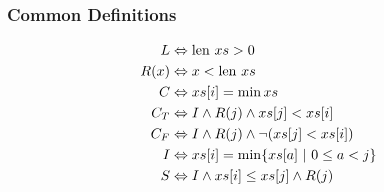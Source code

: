 \begin{lscape}

\label{lit_hoare_proof}

\begin{prooftree}





\end{prooftree}

\begin{multicols}{3}
\subsubsection{Common Definitions}
\begin{align*}
  L &\iff \len xs > 0\\
  R(x) &\iff x < \len xs\\
  C &\iff xs[i] = \min xs\\
  C_{T}&\iff I \land R(j) \land xs[j] < xs[i]\\
  C_{F}&\iff I \land R(j) \land \lnot(xs[j] < xs[i])\\
  I&\iff xs[i] = \min \{xs[a]~|~0 \leq a < j\}\\
  S&\iff I \land xs[i] \leq xs[j] \land R(j)
\end{align*}
\vfill


\end{multicols}
\end{lscape}
